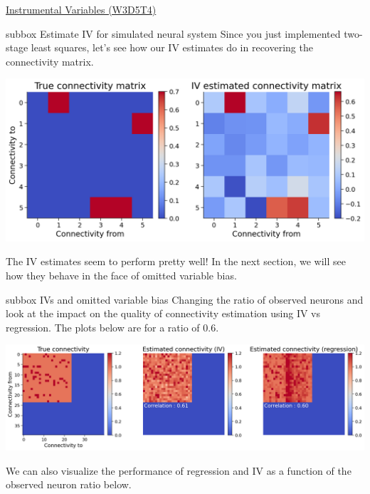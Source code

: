 \begin{textbox}{\href{https://compneuro.neuromatch.io/tutorials/W3D5_NetworkCausality/student/W3D5_Tutorial4.html}{Instrumental Variables (W3D5T4)}   }
\begin{subbox}{subbox}{ Estimate IV for simulated neural system
}
\scriptsize
Since you just implemented two-stage least squares, let's see how our IV estimates do in recovering the connectivity matrix.
\begin{center}
    
\includegraphics[scale=0.2]{Figures/NC/NC_Figure21.png}

\end{center}
The IV estimates seem to perform pretty well! In the next section, we will see how they behave in the face of omitted variable bias.

\end{subbox}

\begin{subbox}{subbox}{ IVs and omitted variable bias
}
\scriptsize
Changing the ratio of observed neurons and look at the impact on the quality of connectivity estimation using IV vs regression. The plots below are for a ratio of 0.6.

\begin{center}
    
\includegraphics[scale=0.16]{Figures/NC/NC_Figure22.png}

\end{center}
We can also visualize the performance of regression and IV as a function of the observed neuron ratio below.


\end{subbox}
\end{textbox}
